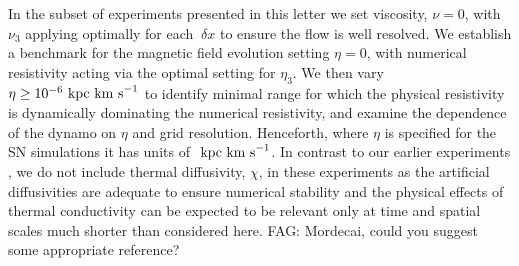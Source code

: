 \documentclass[preprint2]{aastex63}
\newcommand\kpc{~ {\rm kpc}}
\newcommand\dx{~ {\delta x}}
\newcommand\kms{~ {\rm km~ s}^{-1}}
\newcommand{\fag}[1]{\textcolor{midgreen}{FAG: #1}}
\begin{document}
In the subset of experiments presented in this letter we set viscosity, $\nu=0$,
with $\nu_3$ applying optimally for each $\dx$ to ensure the flow is well
resolved.
We establish a benchmark for the magnetic field evolution setting $\eta=0$, with
numerical resistivity acting via the optimal setting for $\eta_3$.
We then vary $\eta\geq10^{-6}\kpc\kms$ to identify minimal range for which the
physical resistivity is dynamically dominating the numerical resistivity, and
examine the dependence of the dynamo on $\eta$ and grid resolution.
Henceforth, where $\eta$ is specified for the SN simulations it has units of
$\kpc\kms$. 
In contrast to our earlier experiments \citep{Gent:2013a,Gent:2013b,GMKSH20},
we do not include thermal diffusivity, $\chi$, in these experiments as the
artificial diffusivities are adequate to ensure numerical stability and the
physical effects of thermal conductivity can be expected to be relevant only
at time and spatial scales much shorter than considered here.
\fag{Mordecai, could you suggest some appropriate reference?}
\end{document}
